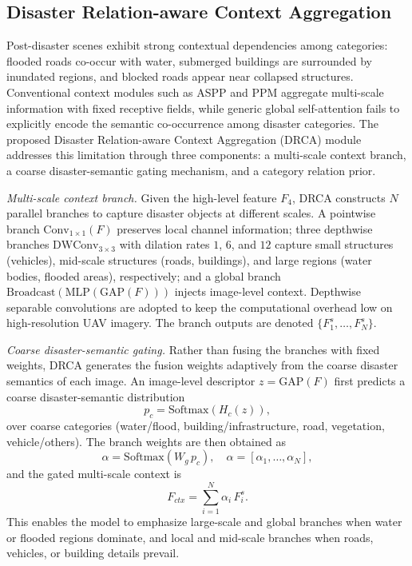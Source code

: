 \documentclass[lettersize,journal]{IEEEtran}
\begin{document}
\subsection{Disaster Relation-aware Context Aggregation}
Post-disaster scenes exhibit strong contextual dependencies among categories: flooded roads co-occur with water, submerged buildings are surrounded by inundated regions, and blocked roads appear near collapsed structures. Conventional context modules such as ASPP and PPM aggregate multi-scale information with fixed receptive fields, while generic global self-attention fails to explicitly encode the semantic co-occurrence among disaster categories. The proposed Disaster Relation-aware Context Aggregation (DRCA) module addresses this limitation through three components: a multi-scale context branch, a coarse disaster-semantic gating mechanism, and a category relation prior.

\textit{Multi-scale context branch.} Given the high-level feature $F_4$, DRCA constructs $N$ parallel branches to capture disaster objects at different scales. A pointwise branch $\mathrm{Conv}_{1\times1}(F)$ preserves local channel information; three depthwise branches $\mathrm{DWConv}_{3\times3}$ with dilation rates $1$, $6$, and $12$ capture small structures (vehicles), mid-scale structures (roads, buildings), and large regions (water bodies, flooded areas), respectively; and a global branch $\mathrm{Broadcast}(\mathrm{MLP}(\mathrm{GAP}(F)))$ injects image-level context. Depthwise separable convolutions are adopted to keep the computational overhead low on high-resolution UAV imagery. The branch outputs are denoted $\{F_1^s,\dots,F_N^s\}$.

\textit{Coarse disaster-semantic gating.} Rather than fusing the branches with fixed weights, DRCA generates the fusion weights adaptively from the coarse disaster semantics of each image. An image-level descriptor $z=\mathrm{GAP}(F)$ first predicts a coarse disaster-semantic distribution
\begin{equation}
p_c = \mathrm{Softmax}(H_c(z)),
\end{equation}
over coarse categories (water/flood, building/infrastructure, road, vegetation, vehicle/others). The branch weights are then obtained as
\begin{equation}
\alpha = \mathrm{Softmax}(W_g\,p_c),\quad \alpha=[\alpha_1,\dots,\alpha_N],
\end{equation}
and the gated multi-scale context is
\begin{equation}
F_{ctx} = \sum_{i=1}^{N}\alpha_i\,F_i^s.
\end{equation}
This enables the model to emphasize large-scale and global branches when water or flooded regions dominate, and local and mid-scale branches when roads, vehicles, or building details prevail.
\end{document}
